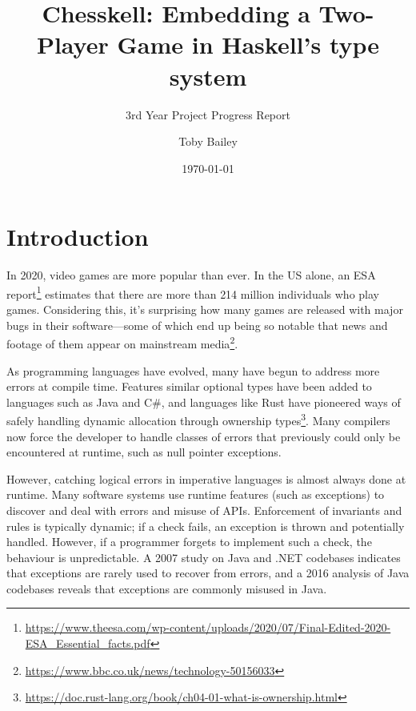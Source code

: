 \documentclass[12pt, a4paper, bibliography=totocnumbered]{scrartcl}
\title{Chesskell: Embedding a Two-Player Game in Haskell's type system}
\subtitle{3rd Year Project Progress Report}
\author{Toby Bailey}
\date{\today}
\begin{document}
\begin{titlepage}
    \maketitle
    \tableofcontents
\end{titlepage}

\section{Introduction}

In 2020, video games are more popular than ever. In the US alone, an ESA report\footnote{\url{https://www.theesa.com/wp-content/uploads/2020/07/Final-Edited-2020-ESA_Essential_facts.pdf}} estimates that there are more than 214 million individuals who play games. Considering this, it's surprising how many games are released with major bugs in their software---some of which end up being so notable that news and footage of them appear on mainstream media\footnote{\url{https://www.bbc.co.uk/news/technology-50156033}}.

As programming languages have evolved, many have begun to address more errors at compile time. Features similar optional types have been added to languages such as Java and C\#, and languages like Rust have pioneered ways of safely handling dynamic allocation through ownership types\footnote{\url{https://doc.rust-lang.org/book/ch04-01-what-is-ownership.html}}. Many compilers now force the developer to handle classes of errors that previously could only be encountered at runtime, such as null pointer exceptions.


However, catching logical errors in imperative languages is almost always done at runtime. Many software systems use runtime features (such as exceptions) to discover and deal with errors and misuse of APIs. Enforcement of invariants and rules is typically dynamic; if a check fails, an exception is thrown and potentially handled. However, if a programmer forgets to implement such a check, the behaviour is unpredictable. A 2007 study \cite{exceptionsusedpoorly} on Java and .NET codebases indicates that exceptions are rarely used to recover from errors, and a 2016 analysis of Java codebases \cite{badjavaexceptions} reveals that exceptions are commonly misused in Java.
\end{document}

